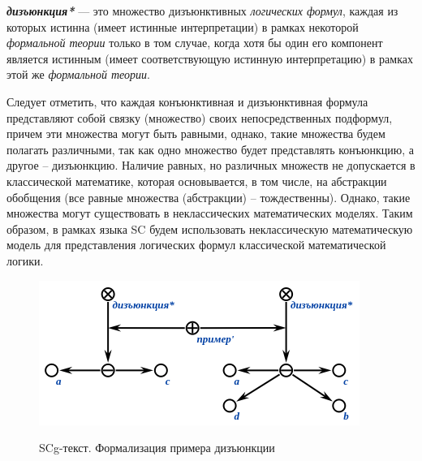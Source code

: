 
\begin{SCn}
\end{SCn}

\textbf{\textit{дизъюнкция*}} --- это множество дизъюнктивных \textit{логических формул}, каждая из которых истинна (имеет истинные интерпретации) в рамках некоторой \textit{формальной теории} только в том случае, когда хотя бы один его компонент является истинным (имеет соответствующую истинную интерпретацию) в рамках этой же \textit{формальной теории}.

Следует отметить, что каждая конъюнктивная и дизъюнктивная формула представляют собой связку (множество) своих непосредственных подформул, причем эти множества могут быть равными, однако, такие множества будем полагать различными, так как одно множество будет представлять конъюнкцию, а другое -- дизъюнкцию. Наличие равных, но различных множеств не допускается в классической математике, которая основывается, в том числе, на абстракции обобщения (все равные множества (абстракции) -- тождественны). Однако, такие множества могут существовать в неклассических математических моделях. Таким образом, в рамках языка SC будем использовать неклассическую математическую модель для представления логических формул классической математической логики.

\begin{figure}[H]
	\caption{SCg-текст. Формализация примера дизъюнкции}
	\includegraphics[scale=0.8]{author/part2/figures/logic/disjunction.png}
	\label{fig:disjunction}
\end{figure}

